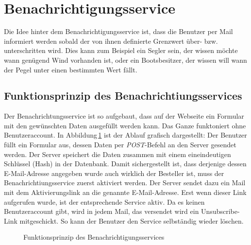 \section{Benachrichtigungsservice}
\label{notifications}
Die Idee hinter dem Benachrichtigungsservice ist, dass die Benutzer per Mail informiert werden sobald der von ihnen definierte Grenzwert über- bzw. unterschritten wird. Dies kann zum Beispiel ein Segler sein, der wissen möchte wann genügend Wind vorhanden ist, oder ein Bootsbesitzer, der wissen will wann der Pegel unter einen bestimmten Wert fällt.


\subsection{Funktionsprinzip des Benachrichtiungsservices}

Der Benachrichtungsservice ist so aufgebaut, dass auf der Webseite ein Formular mit den gewünschten Daten ausgefüllt werden kann. Das Ganze funktoniert ohne Benutzeraccount. In Abbildung\,\ref{img:notificationKonzept} ist der Ablauf grafisch dargestellt: Der Benutzer füllt ein Formular aus, dessen Daten per \emph{POST}-Befehl an den Server gesendet werden. Der Server speichert die Daten zusammen mit einem eineindeutigen Schlüssel (Hash) in der Datenbank. Damit sichergestellt ist, dass derjenige dessen E-Mail-Adresse angegeben wurde auch wirklich der Besteller ist, muss der Benachrichtiungsservice zuerst aktiviert werden. Der Server sendet dazu ein Mail mit dem Aktivierungslink an die genannte E-Mail-Adresse. Erst wenn dieser Link aufgerufen wurde, ist der entsprechende Service aktiv. Da es keinen Benutzeraccount gibt, wird in jedem Mail, das versendet wird ein Unsubscribe-Link mitgeschickt. So kann der Benutzer den Service selbständig wieder löschen.

\begin{figure}[h!]
	\centering
	\caption{Funktionsprinzip des Benachrichtigungsservices}
	\label{img:notificationKonzept}
\end{figure}

